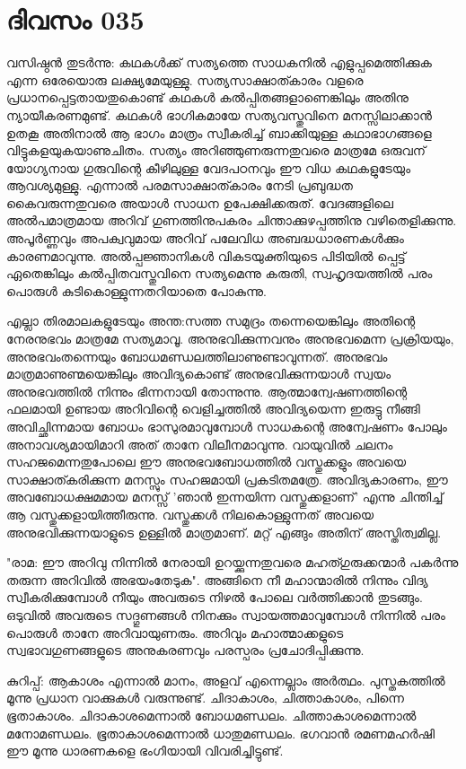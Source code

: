 
\section{ദിവസം 035}



വസിഷ്ഠന്‍ തുടര്‍ന്നു: കഥകള്‍ക്ക്‌ സത്യത്തെ സാധകനില്‍ എളുപ്പമെത്തിക്കുക എന്ന ഒരേയൊരു ലക്ഷ്യമേയുള്ളു. സത്യസാക്ഷാത്കാരം വളരെ പ്രധാനപ്പെട്ടതായതുകൊണ്ട്‌ കഥകള്‍ കല്‍പ്പിതങ്ങളാണെങ്കിലും അതിനു ന്യായീകരണമുണ്ട്‌. കഥകള്‍ ഭാഗികമായേ സത്യവസ്തുവിനെ മനസ്സിലാക്കാന്‍ ഉതകൂ അതിനാല്‍ ആ ഭാഗം മാത്രം സ്വീകരിച്ച്‌ ബാക്കിയുള്ള കഥാഭാഗങ്ങളെ വിട്ടുകളയുകയാണുചിതം. സത്യം അറിഞ്ഞുണരുന്നതുവരെ മാത്രമേ ഒരുവന്‌ യോഗ്യനായ ഗുരുവിന്റെ കീഴിലുള്ള വേദപഠനവും ഈ വിധ കഥകളുടേയും ആവശ്യമുള്ളു. എന്നാല്‍ പരമസാക്ഷാത്കാരം നേടി പ്രബുദ്ധത കൈവരുന്നതുവരെ അയാള്‍ സാധന ഉപേക്ഷിക്കരുത്‌. വേദങ്ങളിലെ അല്‍പമാത്രമായ അറിവ്‌ ഗുണത്തിനുപകരം ചിന്താക്കുഴപ്പത്തിനു വഴിതെളിക്കുന്നു. അപൂര്‍ണ്ണവും അപക്വവുമായ അറിവ്‌ പലേവിധ അബദ്ധധാരണകള്‍ക്കും കാരണമാവുന്നു. അല്‍പ്പജ്ഞാനികള്‍ വികടയുക്തിയുടെ പിടിയില്‍ പ്പെട്ട്‌ ഏതെങ്കിലും കല്‍പ്പിതവസ്തുവിനെ സത്യമെന്നു കരുതി, സ്വഹൃദയത്തില്‍ പരം പൊരുള്‍ കുടികൊള്ളുന്നതറിയാതെ പോകുന്നു. 

എല്ലാ തിരമാലകളുടേയും അന്ത:സത്ത സമുദ്രം തന്നെയെങ്കിലും അതിന്റെ നേരനുഭവം മാത്രമേ സത്യമാവൂ. അനുഭവിക്കുന്നവനും അനുഭവമെന്ന പ്രക്രിയയും, അനുഭവംതന്നെയും ബോധമണ്ഡലത്തിലാണുണ്ടാവുന്നത്‌. അനുഭവം മാത്രമാണുണ്മയെങ്കിലും അവിദ്യകൊണ്ട്‌ അനുഭവിക്കുന്നയാള്‍ സ്വയം അനുഭവത്തില്‍ നിന്നും ഭിന്നനായി തോന്നുന്നു. ആത്മാന്വേഷണത്തിന്റെ ഫലമായി ഉണ്ടായ അറിവിന്റെ വെളിച്ചത്തില്‍ അവിദ്യയെന്ന ഇരുട്ടു നീങ്ങി അവിച്ഛിന്നമായ ബോധം ഭാസുരമാവുമ്പോള്‍ സാധകന്റെ അന്വേഷണം പോലും അനാവശ്യമായിമാറി അത്  താനേ വിലീനമാവുന്നു. വായുവില്‍ ചലനം സഹജമെന്നതുപോലെ ഈ അനുഭവബോധത്തില്‍ വസ്തുക്കളും അവയെ സാക്ഷാത്കരിക്കുന്ന മനസ്സും സഹജമായി പ്രകടിതമത്രേ. അവിദ്യകാരണം, ഈ അവബോധക്ഷമമായ മനസ്സ്‌ 'ഞാന്‍ ഇന്നയിന്ന വസ്തുക്കളാണ്‌' എന്നു ചിന്തിച്ച്‌ ആ വസ്തുക്കളായിത്തീരുന്നു. വസ്തുക്കള്‍ നിലകൊള്ളുന്നത്‌ അവയെ അനുഭവിക്കുന്നയാളുടെ ഉള്ളില്‍ മാത്രമാണ്‌. മറ്റ്  എങ്ങും അതിന്‌ അസ്തിത്വമില്ല. 

"രാമ: ഈ അറിവു നിന്നില്‍ നേരായി ഉറയ്ക്കുന്നതുവരെ മഹത്ഗുരുക്കന്മാര്‍ പകര്‍ന്നു തരുന്ന അറിവില്‍ അഭയംതേടുക". അങ്ങിനെ നീ മഹാന്മാരില്‍ നിന്നും വിദ്യ സ്വീകരിക്കുമ്പോള്‍ നീയും അവരുടെ നിഴല്‍ പോലെ വര്‍ത്തിക്കാന്‍ തുടങ്ങും. ഒടുവില്‍ അവരുടെ സദ്ഗുണങ്ങള്‍ നിനക്കും സ്വായത്തമാവുമ്പോള്‍ നിന്നില്‍ പരം പൊരുള്‍ താനേ അറിവായുണരും. അറിവും മഹാത്മാക്കളുടെ സ്വഭാവഗുണങ്ങളുടെ അനുകരണവും പരസ്പരം പ്രചോദിപ്പിക്കുന്നു.

കുറിപ്പ്‌:
ആകാശം എന്നാല്‍ മാനം, അളവ്‌ എന്നെല്ലാം അര്‍ത്ഥം. പുസ്തകത്തില്‍ മൂന്നു പ്രധാന വാക്കുകള്‍ വരുന്നുണ്ട്‌. ചിദാകാശം, ചിത്താകാശം, പിന്നെ ഭൂതാകാശം. ചിദാകാശമെന്നാല്‍ ബോധമണ്ഡലം. ചിത്താകാശമെന്നാല്‍ മനോമണ്ഡലം. ഭൂതാകാശമെന്നാല്‍ ധാതുമണ്ഡലം. ഭഗവാന്‍ രമണമഹര്‍ഷി ഈ മൂന്നു ധാരണകളെ ഭംഗിയായി വിവരിച്ചിട്ടുണ്ട്‌. 

